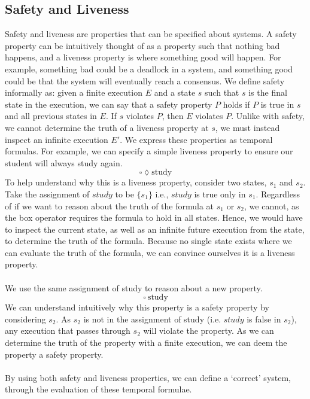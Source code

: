 \subsection{Safety and Liveness}
Safety and liveness are properties that can be specified about systems. A safety property can be intuitively thought of as a property such that nothing bad happens, and a liveness property is where something good will happen. For example, something bad could be a deadlock in a system, and something good could be that the system will eventually reach a consensus. We define safety informally as: given a finite execution $E$ and a state $s$ such that $s$ is the final state in the execution, we can say that a safety property $P$ holds if $P$ is true in $s$ and all previous states in $E$. If $s$ violates $P$, then $E$ violates $P$. Unlike with safety, we cannot determine the truth of a liveness property at $s$, we must instead inspect an infinite execution $E'$. We express these properties as temporal formulas. For example, we can specify a simple liveness property to ensure our student will always study again.
\[
\square \lozenge \text{study}
\]
To help understand why this is a liveness property, consider two states, $s_1$ and $s_2$. Take the assignment of $study$ to be $\{s_1\}$ i.e., $study$ is true only in $s_1$. Regardless of if we want to reason about the truth of the formula at $s_1$ or $s_2$, we cannot, as the box operator requires the formula to hold in all states. Hence, we would have to inspect the current state, as well as an infinite future execution from the state, to determine the truth of the formula. Because no single state exists where we can evaluate the truth of the formula, we can convince ourselves it is a liveness property.
\\ \\
We use the same assignment of study to reason about a new property.
\[
\square \ \text{study}
\]
We can understand intuitively why this property is a safety property by considering $s_2$. As $s_2$ is not in the assignment of study (i.e. $study$ is false in $s_2$), any execution that passes through $s_2$ will violate the property. As we can determine the truth of the property with a finite execution, we can deem the property a safety property.
\\ \\
By using both safety and liveness properties, we can define a `correct' system, through the evaluation of these temporal formulae.
